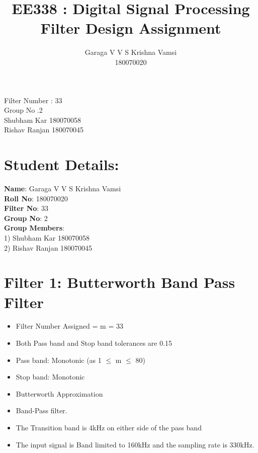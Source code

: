 \documentclass[12pt]{article}
\title{ \color{darkblue}  \textbf{EE338 : Digital Signal Processing \\
Filter Design Assignment}}
\author{ Garaga V V S Krishna Vamsi\\
180070020}
\begin{document}
	\doublespacing
	\maketitle
	\begin{center}
		Filter Number : 33\\
		Group No .2\\
		Shubham Kar 180070058\\
		Rishav Ranjan 180070045\\
	\end{center}
	
	
	\newpage	
	\color{darkblue}\tableofcontents
	\newpage
	\singlespacing
	\color{darkblue}
	\section{Student Details:}
	\color{black}
	\color{darkblue}\textbf{Name}\color{black}: Garaga V V S Krishna Vamsi\\
	\color{darkblue}\textbf{Roll No}\color{black}: 180070020\\
	\color{darkblue}\textbf{Filter No}\color{black}: 33\\
	\color{darkblue}\textbf{Group No}\color{black}: 2\\
	\color{darkblue}\textbf{Group Members}\color{black}:\\
	1) Shubham Kar 180070058\\
	2) Rishav Ranjan 180070045
	
	\color{darkblue}
	\section{Filter 1: Butterworth Band Pass Filter}
	\color{black}
	\begin{itemize}
		\item Filter Number Assigned = m = 33
		\item Both Pass band and Stop band tolerances are 0.15
		\item Pass band: Monotonic  (as 1 $\le$ m $\le$ 80)
		\item Stop band: Monotonic
		\item Butterworth Approximation
		\item Band-Pass filter.
		\item The Transition band is 4kHz on either side of the pass band
		\item The input signal is Band limited to 160kHz and the sampling rate is 330kHz.
	\end{itemize}
	\color{cyan}
\end{document}
